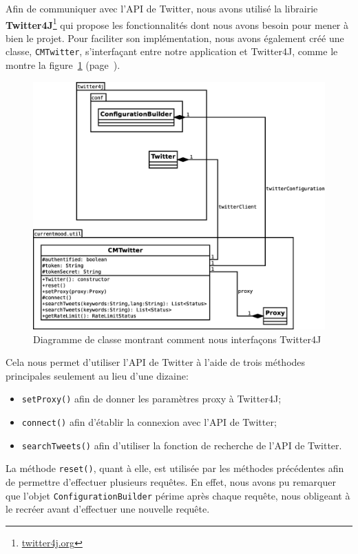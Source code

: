 \documentclass[12pt,a4paper]{report}
\begin{document}
Afin de communiquer avec l'API de Twitter, nous avons utilisé la librairie
\textbf{Twitter4J}\footnote{\href{http://twitter4j.org}{twitter4j.org}} qui
propose les fonctionnalités dont nous avons besoin pour mener à bien le projet.
Pour faciliter son implémentation, nous avons également créé une classe,
\texttt{CMTwitter}, s'interfaçant entre notre application et Twitter4J, comme le
montre la figure~\ref{uml_cmtwitter} (page~\pageref{uml_cmtwitter}).

\begin{figure}%
	\includegraphics[width=\textwidth]{img/uml_cmtwitter.eps}
	\caption{Diagramme de classe montrant comment nous interfaçons Twitter4J}
	\label{uml_cmtwitter}
\end{figure}

Cela nous permet d'utiliser l'API de Twitter à l'aide de trois méthodes
principales seulement au lieu d'une dizaine:

\begin{itemize}
	\item
		\texttt{setProxy()} afin de donner les paramètres proxy à Twitter4J;
	\item
		\texttt{connect()} afin d'établir la connexion avec l'API de Twitter;
	\item
		\texttt{searchTweets()} afin d'utiliser la fonction de recherche de
		l'API de Twitter.
\end{itemize}

La méthode \texttt{reset()}, quant à elle, est utilisée par les méthodes
précédentes afin de permettre d'effectuer plusieurs requêtes. En effet, nous
avons pu remarquer que l'objet \texttt{ConfigurationBuilder} périme après chaque
requête, nous obligeant à le recréer avant d'effectuer une nouvelle requête.
\end{document}
